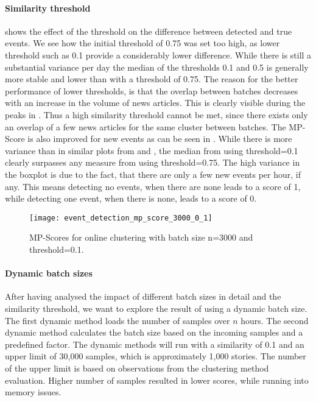 \paragraph{Similarity threshold}
shows the effect of the threshold on the difference between detected and true events.
We see how the initial threshold of 0.75 was set too high,
as lower threshold such as 0.1 provide a considerably lower difference.
While there is still a substantial variance per day the median of the thresholds 0.1 and 0.5
is generally more stable and lower than with a threshold of 0.75.
The reason for the better performance of lower thresholds,
is that the overlap between batches decreases with an increase in the volume of news articles.
This is clearly visible during the peaks in .
Thus a high similarity threshold cannot be met,
since there exists only an overlap of a few news articles for the same cluster between batches.
The MP-Score is also improved for new events as can be seen in .
While there is more variance than in similar plots from 
and ,
the median from using threshold=0.1 clearly surpasses any measure from using threshold=0.75.
The high variance in the boxplot is due to the fact, that there are only a few new events per hour, if any.
This means detecting no events, when there are none leads to a score of 1,
while detecting one event, when there is none, leads to a score of 0.

\begin{figure}[h]
    \centering
    \texttt{[image: event\_detection\_mp\_score\_3000\_0\_1]}
    \caption{MP-Scores for online clustering with batch size n=3000 and threshold=0.1.}
    \label{fig:event_detection_mp_score_3000_0_1}
\end{figure}

\paragraph{Dynamic batch sizes}
After having analysed the impact of different batch sizes in detail and the similarity threshold,
we want to explore the result of using a dynamic batch size.
The first dynamic method loads the number of samples over $n$ hours.
The second dynamic method calculates the batch size based on the incoming samples and a predefined factor.
The dynamic methods will run with a similarity of 0.1 and an upper limit of 30,000 samples,
which is approximately 1,000 stories.
The number of the upper limit is based on observations from the clustering method evaluation.
Higher number of samples resulted in lower scores, while running into memory issues.

